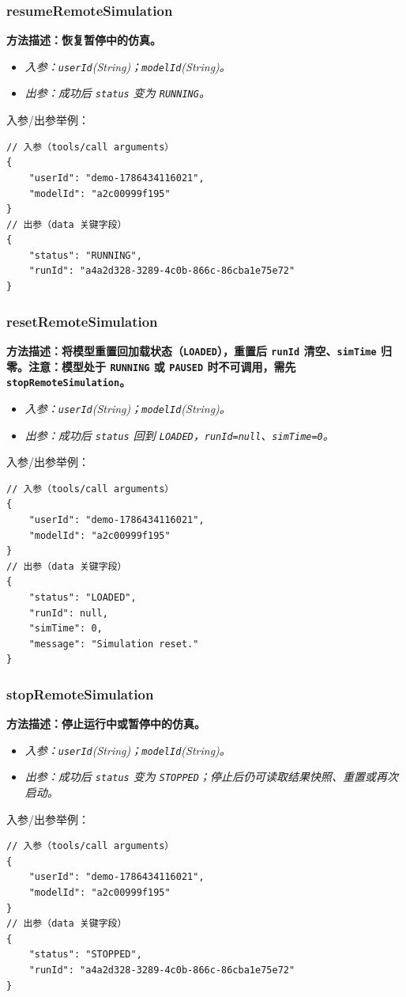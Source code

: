\subsubsection{resumeRemoteSimulation}
\bf{方法描述}：恢复暂停中的仿真。
\begin{itemize}
	\item \it{入参}：\texttt{userId}(String)；\texttt{modelId}(String)。
	\item \it{出参}：成功后 \texttt{status} 变为 \texttt{RUNNING}。
\end{itemize}
入参/出参举例：
\begin{lstlisting}
// 入参（tools/call arguments）
{
    "userId": "demo-1786434116021",
    "modelId": "a2c00999f195"
}
// 出参（data 关键字段）
{
    "status": "RUNNING",
    "runId": "a4a2d328-3289-4c0b-866c-86cba1e75e72"
}
\end{lstlisting}\vspace{-30pt}

\subsubsection{resetRemoteSimulation}
\bf{方法描述}：将模型重置回加载状态（\texttt{LOADED}），重置后 \texttt{runId} 清空、\texttt{simTime} 归零。\bf{注意}：模型处于 \texttt{RUNNING} 或 \texttt{PAUSED} 时不可调用，需先 \texttt{stopRemoteSimulation}。
\begin{itemize}
	\item \it{入参}：\texttt{userId}(String)；\texttt{modelId}(String)。
	\item \it{出参}：成功后 \texttt{status} 回到 \texttt{LOADED}，\texttt{runId=null}、\texttt{simTime=0}。
\end{itemize}
入参/出参举例：
\begin{lstlisting}
// 入参（tools/call arguments）
{
    "userId": "demo-1786434116021",
    "modelId": "a2c00999f195"
}
// 出参（data 关键字段）
{
    "status": "LOADED",
    "runId": null,
    "simTime": 0,
    "message": "Simulation reset."
}
\end{lstlisting}\vspace{-30pt}

\subsubsection{stopRemoteSimulation}
\bf{方法描述}：停止运行中或暂停中的仿真。
\begin{itemize}
	\item \it{入参}：\texttt{userId}(String)；\texttt{modelId}(String)。
	\item \it{出参}：成功后 \texttt{status} 变为 \texttt{STOPPED}；停止后仍可读取结果快照、重置或再次启动。
\end{itemize}
入参/出参举例：
\begin{lstlisting}
// 入参（tools/call arguments）
{
    "userId": "demo-1786434116021",
    "modelId": "a2c00999f195"
}
// 出参（data 关键字段）
{
    "status": "STOPPED",
    "runId": "a4a2d328-3289-4c0b-866c-86cba1e75e72"
}
\end{lstlisting}\vspace{-30pt}

